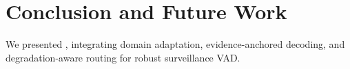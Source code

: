 \section{Conclusion and Future Work}
\label{sec:conclusion}

We presented \evivad{}, integrating domain adaptation, evidence-anchored decoding, and degradation-aware routing for robust surveillance VAD.
